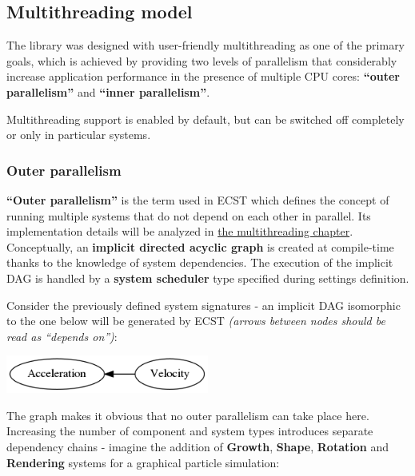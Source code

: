 \documentclass[twoside, 12pt, a4paper, openany]{book}
\let\origfigure=\figure
\let\endorigfigure=\endfigure
\renewenvironment{figure}[1][]{%
\origfigure[H]
}{%
\endorigfigure
}
\begin{document}
\subsection{Multithreading model}\label{multithreading-model}

The library was designed with user-friendly multithreading as one of the
primary goals, which is achieved by providing two levels of parallelism
that considerably increase application performance in the presence of
multiple CPU cores: \textbf{``outer parallelism''} and \textbf{``inner
parallelism''}.

Multithreading support is enabled by default, but can be switched off
completely or only in particular systems.

\hypertarget{overview_outer_parallelism_dag}{\subsubsection{Outer
parallelism}\label{overview_outer_parallelism_dag}}

\textbf{``Outer parallelism''} is the term used in ECST which defines
the concept of running multiple systems that do not depend on each other
in parallel. Its implementation details will be analyzed in
\protect\hyperlink{multithreading_system_scheduling}{the multithreading
chapter}. Conceptually, an \textbf{implicit directed acyclic graph} is
created at compile-time thanks to the knowledge of system dependencies.
The execution of the implicit DAG is handled by a \textbf{system
scheduler} type specified during settings definition.

Consider the previously defined system signatures - an implicit DAG
isomorphic to the one below will be generated by ECST \emph{(arrows
between nodes should be read as ``depends on'')}:

\begin{figure}[htbp]
\centering
\includegraphics[width=0.50000\textwidth]{source/figures/generated/ecst/overview/multithreading/outer/dag0.png}
\caption{ECST multithreading: example outer parallelism DAG \#0}
\end{figure}

The graph makes it obvious that no outer parallelism can take place
here. Increasing the number of component and system types introduces
separate dependency chains - imagine the addition of \textbf{Growth},
\textbf{Shape}, \textbf{Rotation} and \textbf{Rendering} systems for a
graphical particle simulation:
\end{document}
